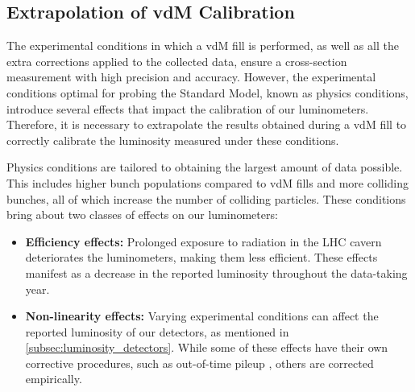 


\subsection{Extrapolation of vdM Calibration}
\label{subsec:extrapolation_of_vdM_calibration}

The experimental conditions in which a vdM fill is performed, as well as all the extra corrections applied to the collected data, ensure a cross-section measurement with high precision and accuracy. However, the experimental conditions optimal for probing the Standard Model, known as physics conditions, introduce several effects that impact the calibration of our luminometers. Therefore, it is necessary to extrapolate the results obtained during a vdM fill to correctly calibrate the luminosity measured under these conditions.

Physics conditions are tailored to obtaining the largest amount of data possible. This includes higher bunch populations compared to vdM fills and more colliding bunches, all of which increase the number of colliding particles. These conditions bring about two classes of effects on our luminometers:

\begin{itemize}
    \item \textbf{Efficiency effects:} Prolonged exposure to radiation in the LHC cavern deteriorates the luminometers, making them less efficient. These effects manifest as a decrease in the reported luminosity throughout the data-taking year.
    \item \textbf{Non-linearity effects:} Varying experimental conditions can affect the reported luminosity of our detectors, as mentioned in \autoref{subsec:luminosity_detectors}. While some of these effects have their own corrective procedures, such as out-of-time pileup \cite{Sirunyan:2759951}, others are corrected empirically.
\end{itemize}

